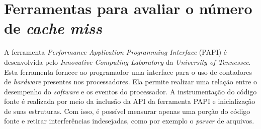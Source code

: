\section{Ferramentas para avaliar o número de \textit{cache miss}}
\label{sec:ferramentasMiss}

   
A ferramenta \textit{Performance Application Programming Interface} (PAPI) \cite{papi} é desenvolvida pelo \textit{Innovative Computing Laboratory} da \textit{University of Tennessee}.
Esta ferramenta fornece ao programador uma interface para o uso de contadores de \textit{hardware} presentes nos processadores.
Ela permite realizar uma relação entre o desempenho do \textit{software} e os eventos do processador.
A instrumentação do código fonte é realizada por meio da inclusão da API da ferramenta PAPI e inicialização de suas estruturas.
Com isso, é possível mensurar apenas uma porção do código fonte e retirar interferências indesejadas, como por exemplo o \textit{parser} de arquivos.

\begin{table}[b]
\centering
\caption{Eventos presentes PAPI}
\label{tab:eventosPAPI}
\end{table}

